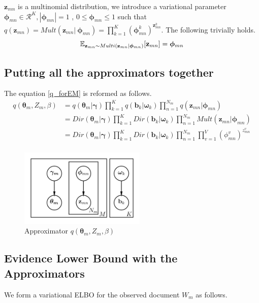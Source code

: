 \documentclass[a4]{article}
\begin{document}
$\mathbf{z}_{mn}$ is a multinomial distribution,
we introduce a variational parameter
$\bm{\phi}_{mn} \in \mathcal{R}^K, |\bm{\phi}_{mn}| = 1$
,
$0 \le \bm{\phi}_{mn} \le 1$ 
such that
$q( \mathbf{z}_{mn}) = Mult(\mathbf{z}_{mn} |\
    \bm{\phi}_{mn}) = \prod_{k=1}^K (\bm{\phi}_{mn}^k)^{\mathbf{z}_{mn}^k}$.
The following trivially holds.
\begin{equation}
   \mathbb{E}_{ \mathbf{z}_{mn} \sim Multi (\mathbf{z}_{mn} |  \bm{\phi}_{mn})}
   [ \mathbf{z}_{mn} ]
   = \bm{\phi}_{mn}\\
\end{equation}

\subsection{Putting all the approximators together}

The equation \ref{q_forEM} is reformed as follows. 
\begin{equation}
\begin{aligned}
    q( \bm{\theta}_m , Z_{m}, \beta )
&=
    q(\bm{\theta}_m | \bm{\gamma} ) 
    \prod_{k=1}^{K} q(\mathbf{b}_k | \bm{\omega}_k ) 
    \prod_{n = 1}^{N_m}  q( \mathbf{z}_{mn} | \bm{\phi}_{mn} )\\
&=
    Dir(\bm{\theta}_m | \bm{\gamma} )
    \prod_{k = 1}^{K}Dir(\mathbf{b}_k | \bm{\omega}_k )
    \prod_{n = 1}^{N_m}  Mult( \mathbf{z}_{mn} | \bm{\phi}_{mn} )\\
&=
    Dir(\bm{\theta}_m | \bm{\gamma} )
    \prod_{k = 1}^{K}Dir(\mathbf{b}_k | \bm{\omega}_k )
    \prod_{n = 1}^{N_m} \prod_{v=1}^V (\phi_{mn}^v)^{z_{mn}^v}
    \label{q_forEM2}\\
\end{aligned}
\end{equation}


\begin{figure}
\centering
\includegraphics[width=6cm]{lda_approximation.png}
\caption{Approximator $q( \bm{\theta}_m , Z_{m}, \beta )$}
\label{fig:lda_approximation}
\end{figure}


\subsection{Evidence Lower Bound with the Approximators}
We form a variational ELBO for the observed document $W_{m}$ as follows.
\end{document}
